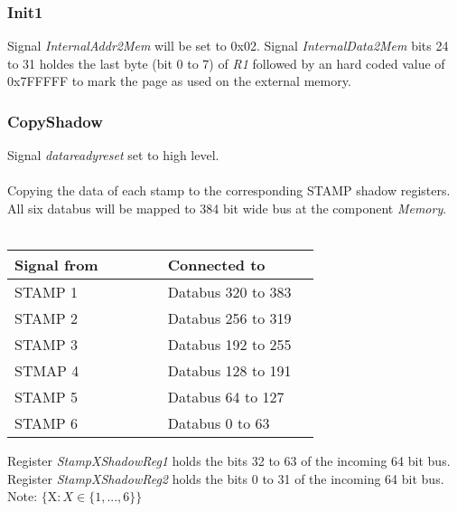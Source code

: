 \subsubsection{Init1} 
Signal \textit{InternalAddr2Mem} will be set to 0x02. 
Signal \textit{InternalData2Mem} bits 24 to 31 holdes the last byte (bit 0 to 7) of \textit{R1} followed by an hard coded value of 0x7FFFFF to mark the page as used on the external memory. 
\subsubsection{CopyShadow} 
Signal \textit{datareadyreset} set to high level.\\\\
Copying the data of each stamp to the corresponding STAMP shadow registers. \\
All six databus will be mapped to 384 bit wide bus at the component \textit{Memory}. \\\\
\begin{longtable} [htb] { | p{0.45 \linewidth} | p{0.45\linewidth} | } \hline
		\textbf{Signal from} & \textbf{Connected to} \\ \hline
\endhead
	STAMP 1 & Databus 320 to 383 \\ \hline 
	STAMP 2 & Databus 256 to 319 \\ \hline 
	STAMP 3 & Databus 192 to 255 \\ \hline
	STMAP 4 & Databus 128 to 191 \\ \hline
	STAMP 5 & Databus 64 to 127 \\ \hline
	STAMP 6 & Databus 0 to 63 \\ \hline 	
\end{longtable} 
Register \textit{StampXShadowReg1} holds the bits 32 to 63 of the incoming 64 bit bus. \\ 
Register \textit{StampXShadowReg2} holds the bits 0 to 31 of the incoming 64 bit bus. 
Note: $\{ \text{X} : \textit{X} \in  \{1, ..., 6\} \}$ 
